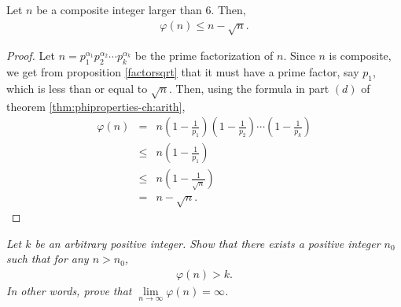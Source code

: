 \documentclass[12pt]{subfile}
\begin{document}
		\begin{theorem}
			Let $n$ be a composite integer larger than $6$. Then,
				\begin{align*}
				 \varphi(n) \leq n - \sqrt n.
				\end{align*}
		\end{theorem}
		
		\begin{proof}
			Let $n= p_1^{\alpha_1} p_2^{\alpha_2} \cdots p_k^{\alpha_k}$ be the prime factorization of $n$. Since $n$ is composite, we get from proposition \eqref{factorsqrt} that it must have a prime factor, say $p_1$, which is less than or equal to $\sqrt n$. Then, using the formula in part $(d)$ of theorem \eqref{thm:phiproperties-ch:arith},
				\begin{eqnarray*}
					\varphi(n) &=& n \left( 1 - \frac{1}{p_1} \right)  \left( 1 - \frac{1}{p_2} \right)  \cdots \left( 1 - \frac{1}{p_k} \right)  \\
							   &\leq& n \left( 1 - \frac{1}{p_1} \right)\\
							   &\leq& n \left( 1 - \frac{1}{\sqrt n} \right)\\
							   &=& n - \sqrt n.
				\end{eqnarray*}
		\end{proof}
		
		\begin{theorem}\slshape
			Let $k$ be an arbitrary positive integer. Show that there exists a positive integer $n_0$ such that for any $n>n_0$,
				\begin{align*}
						\varphi(n) > k.
				\end{align*}
			In other words, prove that $\lim\limits_{n \to \infty} \varphi(n)= \infty$.
		\end{theorem}
		
\end{document}
